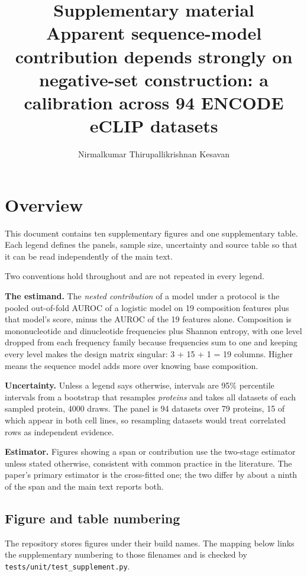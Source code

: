 \documentclass[11pt]{article}
\title{Supplementary material\\[0.3em]
\large Apparent sequence-model contribution depends strongly on negative-set construction:
a calibration across 94 ENCODE eCLIP datasets}
\author{Nirmalkumar Thirupallikrishnan Kesavan}
\date{}
\begin{document}
\maketitle

\section*{Overview}

This document contains ten supplementary figures and one supplementary table. Each legend
defines the panels, sample size, uncertainty and source table so that it can be read
independently of the main text.

Two conventions hold throughout and are not repeated in every legend.

\textbf{The estimand.} The \emph{nested contribution} of a model under a protocol is the pooled
out-of-fold AUROC of a logistic model on 19 composition features plus that model's score, minus
the AUROC of the 19 features alone. Composition is mononucleotide and dinucleotide frequencies
plus Shannon entropy, with one level dropped from each frequency family because frequencies sum
to one and keeping every level makes the design matrix singular: 3 + 15 + 1 = 19 columns.
Higher means the sequence model adds more over knowing base composition.

\textbf{Uncertainty.} Unless a legend says otherwise, intervals are 95\% percentile intervals
from a bootstrap that resamples \emph{proteins} and takes all datasets of each sampled protein,
4000 draws. The panel is 94 datasets over 79 proteins, 15 of which appear in both cell lines,
so resampling datasets would treat correlated rows as independent evidence.

\textbf{Estimator.} Figures showing a span or contribution use the two-stage estimator unless
stated otherwise, consistent with common practice in the literature. The paper's primary estimator is the
cross-fitted one; the two differ by about a ninth of the span and the main text reports both.

\subsection*{Figure and table numbering}

The repository stores figures under their build names. The mapping below links the supplementary
numbering to those filenames and is checked by \texttt{tests/unit/test\_supplement.py}.
\end{document}
